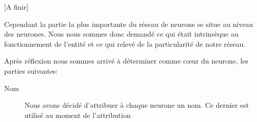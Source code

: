 [A finir]

Cependant la partie la plus importante du réseau de neurone se situe au niveau
des neurones. Nous nous sommes donc demandé ce qui était intrinsèque au
fonctionnement de l'entité et ce qui relevé de la particularité de notre réseau.

Après réflexion nous sommes arrivé à déterminer comme cœur du neurone, les
parties suivantes:\\

\begin{description}
  \item[Nom] Nous avons décidé d'attribuer à chaque neurone un nom. Ce dernier
    est utilisé au moment de l'attribution
\end{description}
